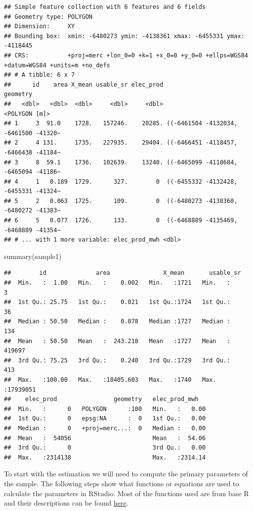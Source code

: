 \documentclass[
]{book}
\newenvironment{Shaded}{\begin{snugshade}}{\end{snugshade}}
\newcommand{\FunctionTok}[1]{\textcolor[rgb]{0.00,0.00,0.00}{#1}}
\newcommand{\NormalTok}[1]{#1}
\begin{document}
\begin{verbatim}
## Simple feature collection with 6 features and 6 fields
## Geometry type: POLYGON
## Dimension:     XY
## Bounding box:  xmin: -6480273 ymin: -4138361 xmax: -6455331 ymax: -4118445
## CRS:           +proj=merc +lon_0=0 +k=1 +x_0=0 +y_0=0 +ellps=WGS84 +datum=WGS84 +units=m +no_defs
## # A tibble: 6 x 7
##      id    area X_mean usable_sr elec_prod                              geometry
##   <dbl>   <dbl>  <dbl>     <dbl>     <dbl>                         <POLYGON [m]>
## 1     3  91.0    1728.   157246.    20285. ((-6461504 -4132034, -6461500 -41320~
## 2     4 131.     1735.   227935.    29404. ((-6466451 -4118457, -6466438 -41184~
## 3     8  59.1    1736.   102639.    13240. ((-6465099 -4118684, -6465094 -41186~
## 4     1   0.189  1729.      327.        0  ((-6455332 -4132428, -6455331 -41324~
## 5     2   0.063  1725.      109.        0  ((-6480273 -4138360, -6480272 -41383~
## 6     5   0.077  1726.      133.        0  ((-6468889 -4135469, -6468889 -41354~
## # ... with 1 more variable: elec_prod_mwh <dbl>
\end{verbatim}

\begin{Shaded}
\begin{Highlighting}[]
\FunctionTok{summary}\NormalTok{(sample1)}
\end{Highlighting}
\end{Shaded}

\begin{verbatim}
##        id              area               X_mean       usable_sr       
##  Min.   :  1.00   Min.   :    0.002   Min.   :1721   Min.   :       3  
##  1st Qu.: 25.75   1st Qu.:    0.021   1st Qu.:1724   1st Qu.:      36  
##  Median : 50.50   Median :    0.078   Median :1727   Median :     134  
##  Mean   : 50.50   Mean   :  243.218   Mean   :1727   Mean   :  419697  
##  3rd Qu.: 75.25   3rd Qu.:    0.240   3rd Qu.:1729   3rd Qu.:     413  
##  Max.   :100.00   Max.   :10405.603   Max.   :1740   Max.   :17939051  
##    elec_prod                geometry   elec_prod_mwh    
##  Min.   :      0   POLYGON      :100   Min.   :   0.00  
##  1st Qu.:      0   epsg:NA      :  0   1st Qu.:   0.00  
##  Median :      0   +proj=merc...:  0   Median :   0.00  
##  Mean   :  54056                       Mean   :  54.06  
##  3rd Qu.:      0                       3rd Qu.:   0.00  
##  Max.   :2314138                       Max.   :2314.14
\end{verbatim}

To start with the estimation we will need to compute the primary parameters of the sample.
The following steps show what functions or equations are used to calculate the parameters in RStudio. Most of the functions used are from base R and their descriptions can be found \href{https://stat.ethz.ch/R-manual/R-devel/library/base/html/00Index.html}{here}.
\end{document}
